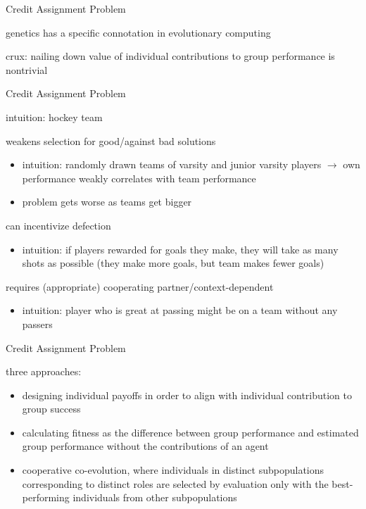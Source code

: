 \begin{frame}{Credit Assignment Problem}

genetics has a specific connotation in evolutionary computing

crux: nailing down value of individual contributions to group performance is nontrivial \cite{panait2005cooperative}

\end{frame}

\begin{frame}{Credit Assignment Problem}

intuition: hockey team

weakens selection for good/against bad solutions
\begin{itemize}
\item intuition: randomly drawn teams of varsity and junior varsity players $\rightarrow$ own performance weakly correlates with team performance
\item problem gets worse as teams get bigger
\end{itemize}

can incentivize defection
\begin{itemize}
\item intuition: if players rewarded for goals they make, they will take as many shots as possible (they make more goals, but team makes fewer goals)
\end{itemize}

requires (appropriate) cooperating partner/context-dependent
\begin{itemize}
\item intuition: player who is great at passing might be on a team without any passers
\end{itemize}

\end{frame}

\begin{frame}{Credit Assignment Problem}

three approaches:
\begin{itemize}
\item designing individual payoffs in order to align with individual contribution to group success \cite{waibel2009genetic}
\item calculating fitness as the difference between group performance and estimated group performance without the contributions of an agent \cite{knudson2010coevolution}
\item cooperative co-evolution, where individuals in distinct subpopulations corresponding to distinct roles are selected by evaluation only with the best-performing individuals from other subpopulations \cite{gomes2015cooperative}
\end{itemize}

\end{frame}
